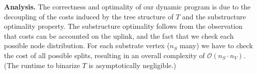 \documentclass[9pt]{sigcomm-alternate}
\newcommand{\SubstrateNodes}{\ensuremath{V_S}}
\newcommand{\SubstrateNode}{\ensuremath{v}}
\newcommand{\Opt}{\ensuremath{Opt}}
\newcommand{\Uplink}{\ensuremath{\textsc{uplink}}}
\newcommand{\ChunkCount}{\ensuremath{\textsc{cis}}}
\newcommand{\capacity}{\emph{cap}}
\newcommand{\Tree}{\ensuremath{T}}
\newcommand{\CostTrans}{\ensuremath{b_1}}
\newcommand{\CostCom}{\ensuremath{b_2}}
\newcommand{\Vms}{\ensuremath{n_V}}
\begin{document}

\textbf{Analysis.}
The correctness and optimality of our dynamic program
is due to the decoupling of the costs induced by the tree
structure of $\Tree$ and the  substructure
optimality property.
The substructure optimality follows from the observation that
costs can be accounted on the uplink, and the fact
 that we check each possible node distribution.
For each substrate vertex ($n_S$ many) we have
to check the cost of all possible splits,
resulting in an overall complexity of $\mathcal{O}(n_S \cdot n_V)$.
(The runtime to binarize $\Tree$ is asymptotically negligible.)
\end{document}
